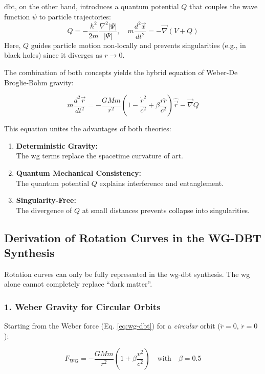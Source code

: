 \gls{dbt}, on the other hand, introduces a quantum potential $Q$ that couples the wave function $\psi$ to particle trajectories:
\begin{equation}
    \label{eq:wg-dbt-q}
    Q = -\frac{\hbar^2}{2m}\frac{\nabla^2 |\Psi|}{|\Psi|}, \quad m\frac{d^2\vec{x}}{dt^2} = -\vec{\nabla}(V + Q)
\end{equation}
Here, $Q$ guides particle motion non-locally and prevents singularities (e.g., in black holes) since it diverges as $r \to 0$.

The combination of both concepts yields the hybrid equation of Weber-De Broglie-Bohm gravity:

\begin{equation}
    m\frac{d^2\vec{r}}{dt^2} = -\frac{GMm}{r^2}\left(1 - \frac{\dot{r}^2}{c^2} + \beta \frac{r\ddot{r}}{c^2}\right)\hat{{\vec{r}}} - \vec{\nabla} Q
\end{equation}

This equation unites the advantages of both theories:
\begin{enumerate}
    \item \textbf{Deterministic Gravity:}\\The \gls{wg} terms replace the spacetime curvature of \gls{art}.
    \item \textbf{Quantum Mechanical Consistency:}\\The quantum potential $Q$ explains interference and entanglement.
    \item \textbf{Singularity-Free:}\\The divergence of $Q$ at small distances prevents collapse into singularities.
\end{enumerate}

\subsection{Derivation of Rotation Curves in the WG-DBT Synthesis}
Rotation curves can only be fully represented in the \gls{wg}-\gls{dbt} synthesis. The \gls{wg} alone cannot completely replace \enquote{dark matter}.

\subsubsection{1. Weber Gravity for Circular Orbits}
Starting from the Weber force (Eq. \ref{eq:wg-dbt}) for a \textit{circular} orbit ($\ddot{r} = 0$, $\dot{r} = 0$):

\begin{equation}
F_{\text{WG}} = -\frac{GMm}{r^2}\left(1 + \beta\frac{v^2}{c^2}\right) \quad \text{with} \quad \beta = 0.5
\end{equation}

